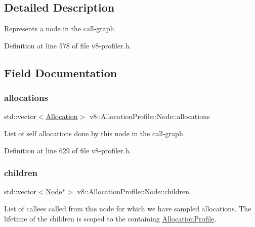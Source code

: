 \subsection{Detailed Description}
Represents a node in the call-\/graph. 

Definition at line 578 of file v8-\/profiler.\+h.



\subsection{Field Documentation}
\mbox{\label{structv8_1_1AllocationProfile_1_1Node_a6ee0934b35ba77fb5d8b53f02d5a3068}} 
\subsubsection{\texorpdfstring{allocations}{allocations}}
{\footnotesize\ttfamily std\+::vector$<$\mbox{\hyperlink{structv8_1_1AllocationProfile_1_1Allocation}{Allocation}}$>$ v8\+::\+Allocation\+Profile\+::\+Node\+::allocations}

List of self allocations done by this node in the call-\/graph. 

Definition at line 629 of file v8-\/profiler.\+h.

\mbox{\label{structv8_1_1AllocationProfile_1_1Node_a176673c0440cb1baaf7713e14da84db0}} 
\subsubsection{\texorpdfstring{children}{children}}
{\footnotesize\ttfamily std\+::vector$<$\mbox{\hyperlink{structv8_1_1AllocationProfile_1_1Node}{Node}}$\ast$$>$ v8\+::\+Allocation\+Profile\+::\+Node\+::children}

List of callees called from this node for which we have sampled allocations. The lifetime of the children is scoped to the containing \mbox{\hyperlink{classv8_1_1AllocationProfile}{Allocation\+Profile}}. 

